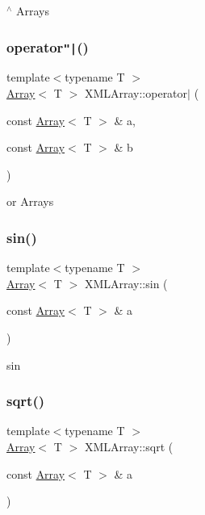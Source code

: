 $^\wedge$ Arrays 

\mbox{\label{namespaceXMLArray_acde7f1ff51638a7a8f4cf4a096e08e1c}} 
\subsubsection{\texorpdfstring{operator\texttt{"|}()}{operator|()}}
{\footnotesize\ttfamily template$<$typename T $>$ \\
\mbox{\hyperlink{classXMLArray_1_1Array}{Array}}$<$ T $>$ X\+M\+L\+Array\+::operator$\vert$ (\begin{DoxyParamCaption}\item[{const \mbox{\hyperlink{classXMLArray_1_1Array}{Array}}$<$ T $>$ \&}]{a,  }\item[{const \mbox{\hyperlink{classXMLArray_1_1Array}{Array}}$<$ T $>$ \&}]{b }\end{DoxyParamCaption})\hspace{0.3cm}{\ttfamily [inline]}}



or Arrays 

\mbox{\label{namespaceXMLArray_a2d0e4bcea1d1d685dc5ba46bba31ff5b}} 
\subsubsection{\texorpdfstring{sin()}{sin()}}
{\footnotesize\ttfamily template$<$typename T $>$ \\
\mbox{\hyperlink{classXMLArray_1_1Array}{Array}}$<$ T $>$ X\+M\+L\+Array\+::sin (\begin{DoxyParamCaption}\item[{const \mbox{\hyperlink{classXMLArray_1_1Array}{Array}}$<$ T $>$ \&}]{a }\end{DoxyParamCaption})\hspace{0.3cm}{\ttfamily [inline]}}



sin 

\mbox{\label{namespaceXMLArray_a6b3f8ee1d76ecaf106e799ed6278b303}} 
\subsubsection{\texorpdfstring{sqrt()}{sqrt()}}
{\footnotesize\ttfamily template$<$typename T $>$ \\
\mbox{\hyperlink{classXMLArray_1_1Array}{Array}}$<$ T $>$ X\+M\+L\+Array\+::sqrt (\begin{DoxyParamCaption}\item[{const \mbox{\hyperlink{classXMLArray_1_1Array}{Array}}$<$ T $>$ \&}]{a }\end{DoxyParamCaption})\hspace{0.3cm}{\ttfamily [inline]}}



